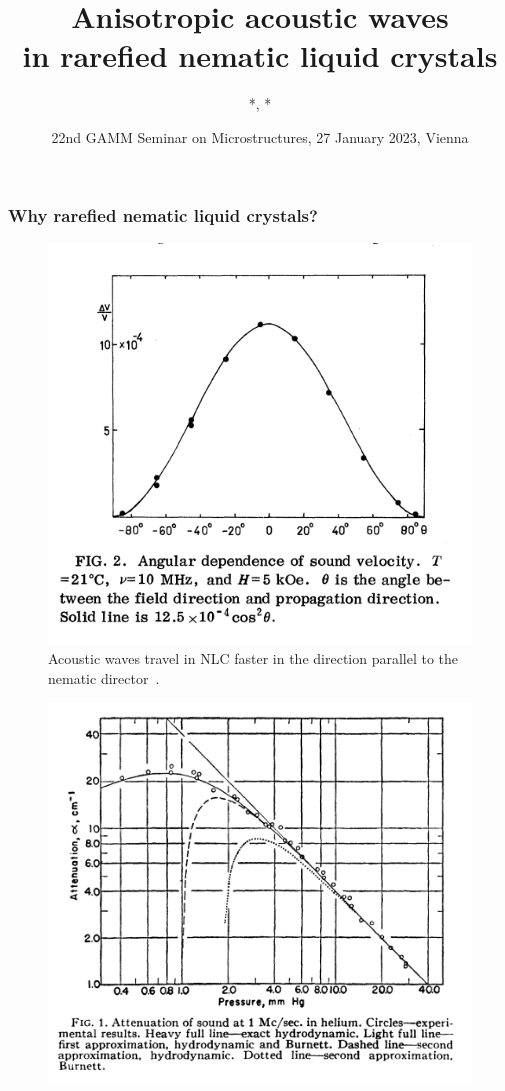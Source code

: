 \documentclass{beamer}
\title[Acoustic rarefied nematic liquid crystals]{Anisotropic acoustic waves \vspace{0.2cm}\\ in rarefied nematic liquid crystals} %
\author%
{%
	\sc{P. E. Farrell}*, \underline{\sc{U. Zerbinati}}*\\
}
\institute%
{%
	* \textit{Mathematical Institute}\\
	\;\textit{University of Oxford}\\
}
\date[\textbf{GAMM}]{22nd GAMM Seminar on Microstructures, 27 January 2023, Vienna} %
\begin{document}
	\begin{frame}[plain]
		\titlepage
	\end{frame}
	\begin{frame}
		\frametitle{Why rarefied nematic liquid crystals?}
		\begin{minipage}{0.49\textwidth}
			\vspace{0.8cm}
			\begin{figure}
				\includegraphics[scale=0.25]{Figures/MullenLuthiStephen}
				\vspace{-0.4cm}
				\caption{Acoustic waves travel in NLC faster in the direction parallel to the nematic director~\cite{MullenEtAll}.}
			\end{figure}
		\end{minipage}
		\begin{minipage}{0.49\textwidth}
			\vspace{1cm}
			\begin{figure}
				\includegraphics[scale=0.25]{Figures/Greenspan}

\end{figure}
\end{minipage}
\end{frame}
\end{document}
